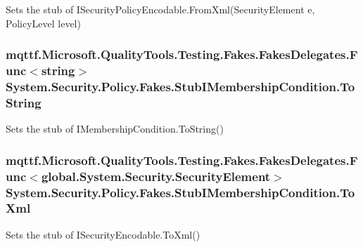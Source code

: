 Sets the stub of I\-Security\-Policy\-Encodable.\-From\-Xml(\-Security\-Element e, Policy\-Level level)

\hypertarget{class_system_1_1_security_1_1_policy_1_1_fakes_1_1_stub_i_membership_condition_a7051e5632aecb901f5f6f701bbf1bf9e}{
\subsubsection[{To\-String}]{\setlength{\rightskip}{0pt plus 5cm}mqttf.\-Microsoft.\-Quality\-Tools.\-Testing.\-Fakes.\-Fakes\-Delegates.\-Func$<$string$>$ System.\-Security.\-Policy.\-Fakes.\-Stub\-I\-Membership\-Condition.\-To\-String}}\label{class_system_1_1_security_1_1_policy_1_1_fakes_1_1_stub_i_membership_condition_a7051e5632aecb901f5f6f701bbf1bf9e}


Sets the stub of I\-Membership\-Condition.\-To\-String()

\hypertarget{class_system_1_1_security_1_1_policy_1_1_fakes_1_1_stub_i_membership_condition_a7decefb45885a8a820d3d4ca173550b5}{
\subsubsection[{To\-Xml}]{\setlength{\rightskip}{0pt plus 5cm}mqttf.\-Microsoft.\-Quality\-Tools.\-Testing.\-Fakes.\-Fakes\-Delegates.\-Func$<$global.\-System.\-Security.\-Security\-Element$>$ System.\-Security.\-Policy.\-Fakes.\-Stub\-I\-Membership\-Condition.\-To\-Xml}}\label{class_system_1_1_security_1_1_policy_1_1_fakes_1_1_stub_i_membership_condition_a7decefb45885a8a820d3d4ca173550b5}


Sets the stub of I\-Security\-Encodable.\-To\-Xml()

